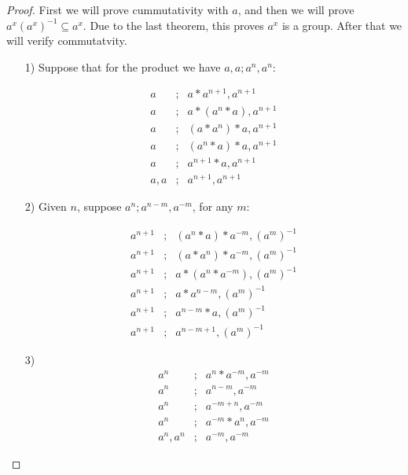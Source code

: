 \documentclass [12pt]{book}
\begin{document}
\begin{proof}

 First we will prove cummutativity with $a$, and then we will prove $a^{x}(a^{x})^{-1}\subseteq a^{x}$. Due to the last theorem, this proves $a^{x}$ is a group. After that we will verify commutatvity.

\begin{itemize}

\item[1)] Suppose that for the product we have $a,a;a^{n},a^{n}$:

\begin{eqnarray}\nonumber a&;&a*a^{n+1},a^{n+1}\\\nonumber a&;&a*(a^{n}*a),a^{n+1}\\\nonumber a&;&(a*a^{n})*a,a^{n+1}\\\nonumber a&;&(a^{n}*a)*a,a^{n+1}\\\nonumber a&;&a^{n+1}*a,a^{n+1}\\\nonumber a,a&;&a^{n+1},a^{n+1}\end{eqnarray}

\item[2)] Given $n$, suppose $a^{n};a^{n-m},a^{-m}$, for any $m$:

\begin{eqnarray}\nonumber a^{n+1}&;&(a^{n}*a)*a^{-m},(a^{m})^{-1}\\\nonumber a^{n+1}&;&(a*a^{n})*a^{-m},(a^{m})^{-1}\\\nonumber a^{n+1}&;&a*(a^{n}*a^{-m}),(a^{m})^{-1}\\\nonumber a^{n+1}&;&a*a^{n-m},(a^{m})^{-1}\\\nonumber a^{n+1}&;&a^{n-m}*a,(a^{m})^{-1}\\\nonumber a^{n+1}&;&a^{n-m+1},(a^{m})^{-1}\end{eqnarray}

\item[3)]\begin{eqnarray}\nonumber a^{n}&;&a^n*a^{-m},a^{-m}\\\nonumber a^{n}&;&a^{n-m},a^{-m}\\\nonumber a^{n}&;&a^{-m+n},a^{-m}\\\nonumber a^{n}&;&a^{-m}*a^n,a^{-m}\\\nonumber a^{n},a^n&;&a^{-m},a^{-m}\end{eqnarray}
\end{itemize}

\end{proof}
\end{document}

